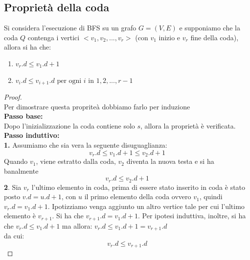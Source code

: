 \subsection{Proprietà della coda}
Si considera l’esecuzione di BFS su un grafo $G = (V, E)$ e supponiamo che la coda $Q$ contenga
i vertici $<v_1,v_2,...,v_r >$ (con $v_1$ inizio e $v_r$ fine della coda), allora si ha che:
\begin{enumerate}
    \item $v_r .d \le v_1 .d+ 1$ 
    \item $v_i .d \le v_{i+1}.d \text{ per ogni }i \text{ in } 1,2,...,r-1$
\end{enumerate}
\begin{proof}
    \leavevmode\\
Per dimostrare questa propriteà dobbiamo farlo per induzione\\
\textbf{Passo base:}\\
Dopo l’inizializzazione la coda contiene solo $s$, allora la proprietà è verificata.\\
\textbf{Passo induttivo:}\\
\textbf{1.} Assumiamo che sia vera la seguente disuguaglianza:\\
$$v_r .d \le v_1 .d+ 1 \le v_2 .d+ 1$$
Quando $v_1$, viene estratto dalla coda, $v_2$ diventa la nuova testa e si ha banalmente\\
$$v_r .d \le v_2 .d+ 1$$
\textbf{2}. Sia $v_r$ l’ultimo elemento in coda, prima di essere stato inserito in coda è stato posto
$v.d= u.d + 1$, con $u$ il primo elemento della coda ovvero $v_1$, quindi $v_r .d= v_1 .d + 1$. 
Ipotizziamo venga aggiunto un altro vertice tale per cui l’ultimo elemento è $v_{r+1}$. Si ha che
$v_{r+1} .d= v_1 .d + 1$. Per ipotesi induttiva, inoltre, si ha che $v_r .d \le v_1 .d + 1$ ma allora:
$v_r .d \le v_1 .d+ 1 = v_{r+1} .d$\\
da cui:\\
$$v_r .d \le v_{r+1} .d$$
\end{proof}
